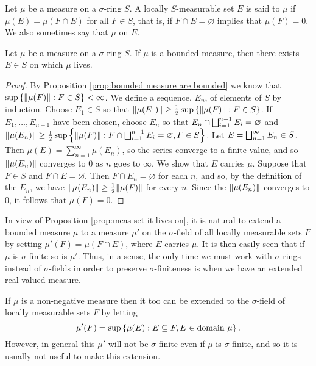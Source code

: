 \begin{definition}
Let $\mu$ be a measure on a $\sigma$-ring $S$. A locally $S$-measurable set $E$ is said to  $\mu$ if $\mu(E)=\mu(F\cap E)$ for all $F\in S$, that is, if $F\cap E=\varnothing$ implies that $\mu(F)=0$. We also sometimes say that $\mu$  on $E$.
\end{definition}

\begin{proposition}
\label{prop:meas set it lives on}
Let $\mu$ be a measure on a $\sigma$-ring $S$. If $\mu$ is a bounded measure, then there exists $E \in S$ on which $\mu$ lives.
\end{proposition}

\begin{proof}
By Proposition \ref{prop:bounded measure are bounded} we know that $\sup\left\{\norm{\mu(F)}: F\in S\right\}<\infty$. We define a sequence, $E_n$, of elements of $S$ by induction. Choose $E_1 \in S$ so that $\norm{\mu(E_1)}\geq\frac12 \sup\left\{\norm{\mu(F)}: F\in S\right\}$. If $E_1,\dots,E_{n-1}$ have been chosen, choose $E_{n}$ so that $E_n \cap \bigsqcup_{i=1}^{n-1}E_{i}=\varnothing$ and $\norm{\mu(E_n)}\geq \frac12\sup\left\{\norm{\mu(F)}: F\cap\bigsqcup_{i=1}^{n-1}E_i=\varnothing,F\in S\right\}$. Let $E=\bigsqcup_{n=1}^{\infty} E_n \in S$. Then $\mu(E)=\sum_{n=1}^{\infty} \mu(E_{n})$, so the series converge to a finite value, and so $\norm{\mu(E_n)}$ converges to $0$ as $n$ goes to $\infty$. We show that $E$ carries $\mu$. Suppose that $F\in S$ and $F\cap E=\varnothing$. Then $F\cap E_n=\varnothing$ for each $n$, and so, by the definition of the $E_n$, we have $\norm{\mu(E_n)}\geq\frac12\norm{\mu(F)}$ for every $n$. Since the $\norm{\mu(E_n)}$ converges to $0$, it follows that $\mu(F)=0$.
\end{proof}

In view of Proposition \ref{prop:meas set it lives on}, it is natural to extend a bounded measure $\mu$ to a measure $\mu'$ on the $\sigma$-field of all locally measurable sets $F$ by setting $\mu'(F)=\mu(F\cap E)$, where $E$ carries $\mu$. It is then easily seen that if $\mu$ is $\sigma$-finite so is $\mu'$. Thus, in a sense, the only time we must work with $\sigma$-rings instead of $\sigma$-fields in order to preserve $\sigma$-finiteness is when we have an extended real valued measure.

If $\mu$ is a non-negative measure then it too can be extended to the $\sigma$-field of locally measurable sets $F$ by letting $$\mu'(F)=\sup\left\{\mu(E):E\subseteq F,E\in\text{domain }\mu\right\}.$$ However, in general this $\mu'$ will not be $\sigma$-finite even if $\mu$ is $\sigma$-finite, and so it is usually not useful to make this extension. 

